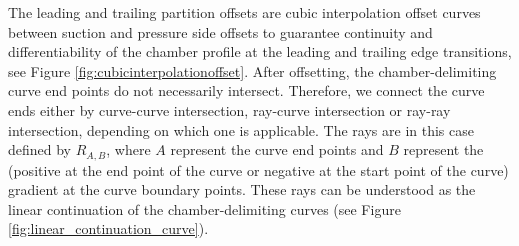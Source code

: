\documentclass[a4paper, 11pt]{report}
\theoremstyle{definition}
\begin{document}
	The leading and trailing partition offsets are cubic interpolation offset curves between suction and pressure side offsets to guarantee continuity and differentiability of the chamber profile at the leading and trailing edge transitions, see Figure \ref{fig:cubicinterpolationoffset}. After offsetting, the chamber-delimiting curve end points do not necessarily intersect. Therefore, we connect the curve ends either by curve-curve intersection, ray-curve intersection or ray-ray intersection, depending on which one is applicable. The rays are in this case defined by $R_{A,B}$, where $A$ represent the curve end points and $B$ represent the (positive at the end point of the curve or negative at the start point of the curve) gradient at the curve boundary points. These rays can be understood as the linear continuation of the chamber-delimiting curves (see Figure \ref{fig:linear_continuation_curve}).
\end{document}
